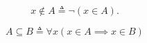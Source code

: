 \begin{frame}{}
  \begin{definition}[$\notin$]
    \[
      x \notin A \triangleq \lnot (x \in A).
    \]
  \end{definition}

  \pause
  \vspace{0.50cm}
  \begin{definition}[$\subseteq$]
    \[
      A \subseteq B \triangleq \forall x (x \in A \implies x \in B)
    \]
  \end{definition}
\end{frame}


